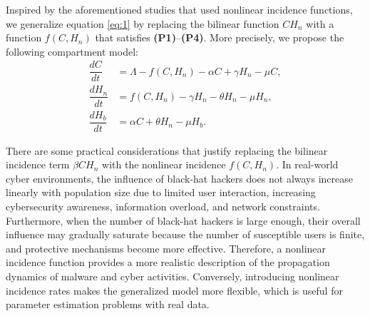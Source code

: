 \documentclass[11pt]{article}
\theoremstyle{definition}
\theoremstyle{remark}
\numberwithin{equation}{section}
\begin{document}
Inspired by the aforementioned studies that used nonlinear incidence functions, we generalize equation \eqref{eq:1} by replacing the bilinear function  $C H_n$ with a function $f(C, H_n)$ that satisfies \textbf{(P1)}--\textbf{(P4)}. 
More precisely, we propose the following compartment model:
\begin{equation}\label{eq:1G}
\begin{split}
 \dfrac{dC}{dt} &= \Lambda - f(C, H_n) -\alpha C + \gamma H_n -\mu C, \\
 \dfrac{dH_n}{dt} &= f(C, H_n) - \gamma H_n - \theta H_n - \mu H_n,\\
 \dfrac{d H_b}{dt} &= \alpha C + \theta H_n - \mu H_b.
\end{split}
\end{equation}

There are some practical considerations that justify replacing the bilinear incidence term $\beta CH_n$ with the nonlinear incidence $f(C,H_n)$. 
In real-world cyber environments, the influence of black-hat hackers does not always increase linearly with population size due to limited user interaction, increasing cybersecurity awareness, information overload, and network constraints. 
Furthermore, when the number of black-hat hackers is large enough, their overall influence may gradually saturate because the number of susceptible users is finite, and protective mechanisms become more effective. 
Therefore, a nonlinear incidence function provides a more realistic description of the propagation dynamics of malware and cyber activities.
Conversely, introducing nonlinear incidence rates makes the generalized model more flexible, which is useful for parameter estimation problems with real data.
\end{document}
